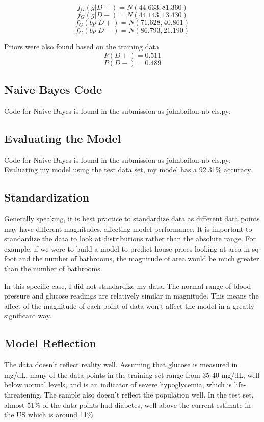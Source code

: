 \documentclass{article}
\begin{document}
\[f_G(g | D+) = N(44.633, 81.360)\]
\[f_G(g | D-) = N(44.143, 13.430)\]
\[f_G(bp | D+) = N(71.628, 40.861) \]
\[f_G(bp | D-) = N(86.793, 21.190)\]

Priors were also found based on the training data
\[P(D+) = 0.511\]
\[P(D-) = 0.489\]

\subsection{Naive Bayes Code}
Code for Naive Bayes is found in the submission as johnbailon-nb-cls.py. 

\subsection{Evaluating the Model}
Code for Naive Bayes is found in the submission as johnbailon-nb-cls.py. Evaluating my model using the test data set, my model has a 92.31\% accuracy.

\subsection{Standardization}
 Generally speaking, it is best practice to standardize data as different data points may have different magnitudes, affecting model performance. It is important to standardize the data to look at distributions rather than the absolute range. For example, if we were to build a model to predict house prices looking at area in sq foot and the number of bathrooms, the magnitude of area would be much greater than the number of bathrooms. 

 In this specific case, I did not standardize my data. The normal range of blood pressure and glucose readings are relatively similar in magnitude. This means the affect of the magnitude of each point of data won't affect the model in a greatly significant way.
 

\subsection{Model Reflection}
The data doesn't reflect reality well. Assuming that glucose is measured in mg/dL, many of the data points in the training set range from 35-40 mg/dL, well below normal levels, and is an indicator of severe hypoglycemia, which is life-threatening. The sample also doesn't reflect the population well. In the test set, almost 51\% of the data points had diabetes, well above the current estimate in the US which is around 11\%  
\end{document}
